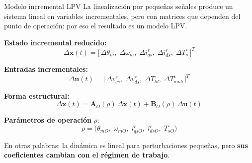 \documentclass[aspectratio=169,t]{beamer}
\begin{document}
\begin{frame}{Modelo incremental LPV}
{\small\color{uncGray}La linealización por pequeñas señales produce un sistema lineal en variables incrementales, pero con matrices que dependen del punto de operación: por eso el resultado es un modelo LPV.}\par
\vspace{3mm}

\textbf{Estado incremental reducido:}
\begin{equation*}
\Delta\bm{x}(t)=
\big[\,\Delta\theta_m,\;\Delta\omega_m,\;\Delta i_{qs}^{r},\;\Delta i_{ds}^{r},\;\Delta T_s^\circ\,\big]^T
\end{equation*}

\textbf{Entradas incrementales:}
\begin{equation*}
\Delta\bm{u}(t)=
\big[\,\Delta v_{qs}^{r},\;\Delta v_{ds}^{r},\;\Delta T_{ld},\;\Delta T_{amb}^\circ\,\big]^T
\end{equation*}

\textbf{Forma estructural:}
\begin{equation*}
\Delta\dot{\bm{x}}(t)=\bm{A}_O(\rho)\,\Delta\bm{x}(t)+\bm{B}_O(\rho)\,\Delta\bm{u}(t)
\end{equation*}

\textbf{Parámetros de operación} $\rho$:
\begin{equation*}
\rho=\big(\theta_{mO},\;\omega_{mO},\;i_{qsO}^{r},\;i_{dsO}^{r},\;T_{sO}^\circ\big)
\end{equation*}

{\small En otras palabras: la dinámica es lineal para perturbaciones pequeñas, pero \textbf{sus coeficientes cambian con el régimen de trabajo}.}
\end{frame}
\end{document}

